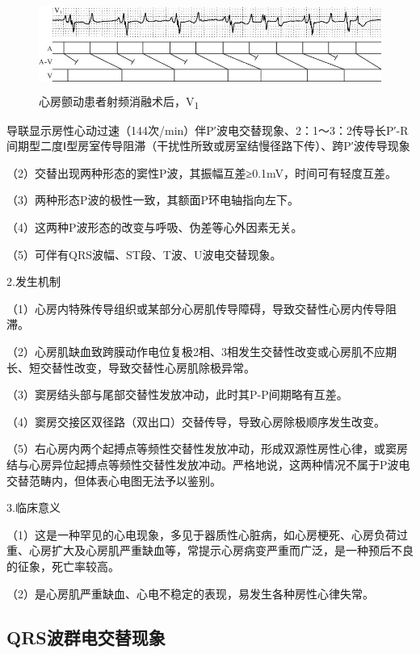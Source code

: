 \begin{figure}[!htbp]
 \centering
 \includegraphics[width=5.33333in,height=1.17708in]{./images/Image00651.jpg}
 \captionsetup{justification=centering}
 \caption{心房颤动患者射频消融术后，V\textsubscript{1}}
 \label{fig39-2}
  \end{figure} 
导联显示房性心动过速（144次/min）伴P′波电交替现象、2：1～3：2传导长P′-R间期型二度Ⅰ型房室传导阻滞（干扰性所致或房室结慢径路下传）、跨P′波传导现象

（2）交替出现两种形态的窦性P波，其振幅互差≥0.1mV，时间可有轻度互差。

（3）两种形态P波的极性一致，其额面P环电轴指向左下。

（4）这两种P波形态的改变与呼吸、伪差等心外因素无关。

（5）可伴有QRS波幅、ST段、T波、U波电交替现象。

2.发生机制

（1）心房内特殊传导组织或某部分心房肌传导障碍，导致交替性心房内传导阻滞。

（2）心房肌缺血致跨膜动作电位复极2相、3相发生交替性改变或心房肌不应期长、短交替性改变，导致交替性心房肌除极异常。

（3）窦房结头部与尾部交替性发放冲动，此时其P-P间期略有互差。

（4）窦房交接区双径路（双出口）交替传导，导致心房除极顺序发生改变。

（5）右心房内两个起搏点等频性交替性发放冲动，形成双源性房性心律，或窦房结与心房异位起搏点等频性交替性发放冲动。严格地说，这两种情况不属于P波电交替范畴内，但体表心电图无法予以鉴别。

3.临床意义

（1）这是一种罕见的心电现象，多见于器质性心脏病，如心房梗死、心房负荷过重、心房扩大及心房肌严重缺血等，常提示心房病变严重而广泛，是一种预后不良的征象，死亡率较高。

（2）是心房肌严重缺血、心电不稳定的表现，易发生各种房性心律失常。

\protect\hypertarget{text00046.htmlux5cux23subid512}{}{}

\subsection{QRS波群电交替现象}

